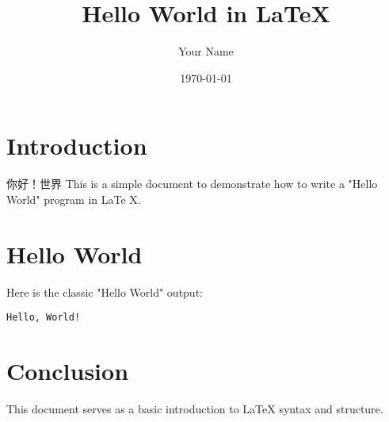 \documentclass{ctexart}
\title{Hello World in LaTeX}
\author{Your Name}
\date{\today}
\begin{document}
\maketitle
\section{Introduction}

你好！世界
This is a simple document to demonstrate how to write a "Hello World" program in LaTe
X.
\section{Hello World}
Here is the classic "Hello World" output:
\begin{verbatim}
Hello, World!
\end{verbatim}
\section{Conclusion}
This document serves as a basic introduction to LaTeX syntax and structure.
\end{document}

